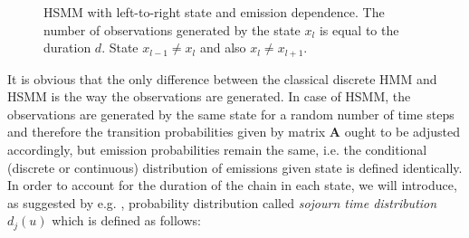 \begin{figure}[htbp]
    \begin{center}
    \end{center}
    \caption[Left-to-right state and emission dependence in Hidden Markov Model]{HSMM with left-to-right state and emission dependence. The number of observations generated by the state $x_l$ is equal to the duration $d$. State $x_{l-1} \neq x_l$ and also $x_l \neq x_{l+1}$.}
    \label{fig:HSMM}
\end{figure}

It is obvious that the only difference between the classical discrete HMM and HSMM is the way the observations are generated. In case of HSMM, the observations are generated by the same state for a random number of time steps and therefore
the transition probabilities given by matrix $\textbf{A}$ ought to be adjusted accordingly, but emission probabilities remain the same, i.e. the conditional (discrete or continuous) distribution of emissions given state is defined identically. In order to account for the duration of the chain in each state, we will introduce,
as suggested by e.g. \citep{Bulla2013}, probability distribution called \textit{sojourn time distribution} $d_{j}(u)$ which is defined as follows:

